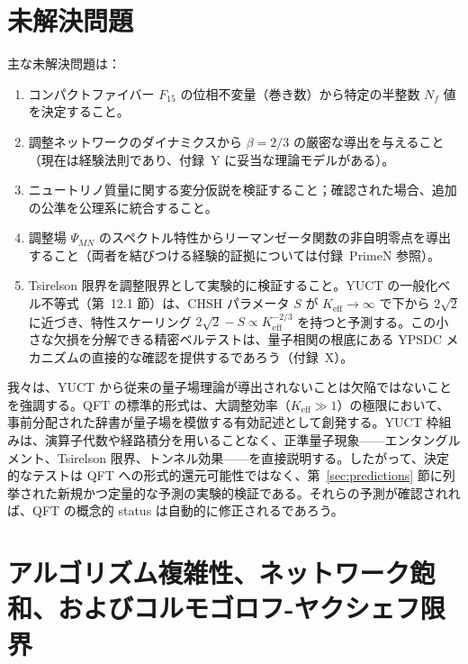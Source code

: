 \documentclass[12pt,a4paper]{article}
\theoremstyle{remark}
\begin{document}
	\section{未解決問題}
	\label{sec:open}
	
	主な未解決問題は：
	
	\begin{enumerate}[label=(\roman*)]
		\item コンパクトファイバー \(F_{15}\) の位相不変量（巻き数）から特定の半整数 \(N_f\) 値を決定すること。
		\item 調整ネットワークのダイナミクスから \(\beta = 2/3\) の厳密な導出を与えること（現在は経験法則であり、付録~Y に妥当な理論モデルがある）。
		\item ニュートリノ質量に関する変分仮説を検証すること；確認された場合、追加の公準を公理系に統合すること。
		\item 調整場 \(\Psi_{MN}\) のスペクトル特性からリーマンゼータ関数の非自明零点を導出すること（両者を結びつける経験的証拠については付録~PrimeN 参照）。
		\item Tsirelson 限界を調整限界として実験的に検証すること。YUCT の一般化ベル不等式（第~12.1 節）は、CHSH パラメータ \(S\) が \(K_{\mathrm{eff}} \to \infty\) で下から \(2\sqrt{2}\) に近づき、特性スケーリング \(2\sqrt{2} - S \propto K_{\mathrm{eff}}^{-2/3}\) を持つと予測する。この小さな欠損を分解できる精密ベルテストは、量子相関の根底にある YPSDC メカニズムの直接的な確認を提供するであろう（付録~X）。
	\end{enumerate}
	
	我々は、YUCT から従来の量子場理論が導出されないことは欠陥ではないことを強調する。QFT の標準的形式は、大調整効率（\(K_{\mathrm{eff}} \gg 1\)）の極限において、事前分配された辞書が量子場を模倣する有効記述として創発する。YUCT 枠組みは、演算子代数や経路積分を用いることなく、正準量子現象——エンタングルメント、Tsirelson 限界、トンネル効果——を直接説明する。したがって、決定的なテストは QFT への形式的還元可能性ではなく、第~\ref{sec:predictions} 節に列挙された新規かつ定量的な予測の実験的検証である。それらの予測が確認されれば、QFT の概念的 status は自動的に修正されるであろう。
	
	\sloppy
	\section{アルゴリズム複雑性、ネットワーク飽和、およびコルモゴロフ-ヤクシェフ限界}
	\label{sec:complexity}
	
\end{document}
